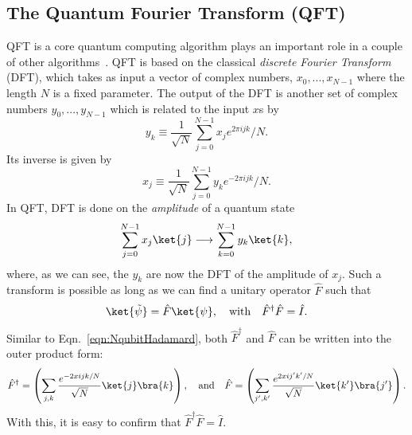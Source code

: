 \subsection{The Quantum Fourier Transform (QFT)}
QFT is a core quantum computing algorithm plays an important role in a couple of other algorithms~\cite{NielsenChuang2010}. QFT is based on the classical \textit{discrete Fourier Transform} (DFT), which takes as input a vector of complex numbers, $x_0,...,x_{N-1}$ where the length $N$ is a fixed parameter. The output of the DFT is another set of complex numbers $y_0,...,y_{N-1}$ which is related to the input $x$s by
\begin{equation}
    y_k\equiv\frac{1}{\sqrt{N}}\sum_{j=0}^{N-1}x_je^{2\pi ijk}/N.
\end{equation}
Its inverse is given by
\begin{equation}
    x_j\equiv\frac{1}{\sqrt{N}}\sum_{j=0}^{N-1}y_ke^{-2\pi ijk}/N.
\end{equation}
In QFT, DFT is done on the \textit{amplitude} of a quantum state
\begin{equation}
    \sum_{j=0}^{N-1}x_j\ket{j}\longrightarrow\sum_{k=0}^{N-1}y_k\ket{k},
\end{equation}
where, as we can see, the  $y_k$ are now the DFT of the amplitude of $x_j$. Such a transform is possible as long as we can find a unitary operator $\hat{F}$ such that
\begin{equation}
    \ket{\tilde{\psi}}=\hat{F}\ket{\psi}, \quad \text{with}\quad\hat{F}^\dagger\hat{F}=\hat{I}.
\end{equation}
Similar to Eqn.~\ref{eqn:NqubitHadamard}, both $\hat{F}^{\dagger}$ and $\hat{F}$ can be written into the outer product form:
\begin{equation}
    \hat{F}^\dagger=\left(\sum_{j,k}\frac{e^{-2xijk/N}}{\sqrt{N}}\ket{j}\bra{k}\right), \quad \text{and}\quad \hat{F}=\left(\sum_{j^{\prime},k^{\prime}}\frac{e^{2xij^{\prime} k^{\prime}/N}}{\sqrt{N}}\ket{k^{\prime}}\bra{j^{\prime}}\right).
\end{equation}
With this, it is easy to confirm that $\hat{F}^\dagger\hat{F}=\hat{I}$. 

